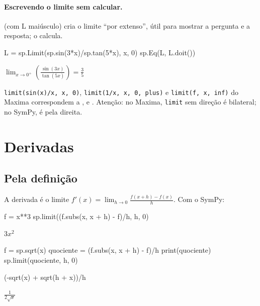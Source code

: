 \paragraph{Escrevendo o limite sem calcular.}  (com L maiúsculo) cria o limite ``por extenso'', útil
para mostrar a pergunta e a resposta;  o calcula.

\begin{entrada}
L = sp.Limit(sp.sin(3*x)/sp.tan(5*x), x, 0)
sp.Eq(L, L.doit())
\end{entrada}
\begin{saidamat}
$\displaystyle \lim_{x \to 0^+}\left(\frac{\sin{\left(3 x \right)}}{\tan{\left(5 x \right)}}\right) = \frac{3}{5}$
\end{saidamat}

\begin{maxima}
\texttt{limit(sin(x)/x, x, 0)}, \texttt{limit(1/x, x, 0, plus)} e \texttt{limit(f, x, inf)} do Maxima
correspondem a ,  e .
Atenção: no Maxima, \texttt{limit} sem direção é bilateral; no SymPy, é pela direita.
\end{maxima}

\section{Derivadas}

\subsection{Pela definição}

A derivada é o limite $f'(x)=\displaystyle\lim_{h\to0}\frac{f(x+h)-f(x)}{h}$. Com o SymPy:

\begin{entrada}
f = x**3
sp.limit((f.subs(x, x + h) - f)/h, h, 0)
\end{entrada}
\begin{saidamat}
$\displaystyle 3 x^{2}$
\end{saidamat}

\begin{entrada}
f = sp.sqrt(x)
quociente = (f.subs(x, x + h) - f)/h
print(quociente)
sp.limit(quociente, h, 0)
\end{entrada}
\begin{saida}
(-sqrt(x) + sqrt(h + x))/h
\end{saida}
\begin{saidamat}
$\displaystyle \frac{1}{2 \sqrt{x}}$
\end{saidamat}

